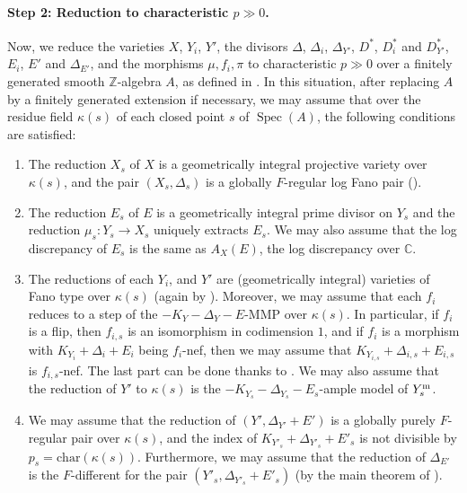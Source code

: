 \documentclass[11pt,reqno]{amsart}
\newcommand{\C}{\mathbb{C}}
\newcommand{\Z}{\mathbb{Z}}
\DeclareMathOperator{\Spec}{Spec}
\numberwithin{equation}{section}
\theoremstyle{definition}
\begin{document}
\medskip

\paragraph{\textbf{Step 2: Reduction to characteristic $p \gg 0$.}} Now, we reduce the varieties $X$, $Y_i$, $Y'$, the divisors $\Delta$, $\Delta_i$, $\Delta_{Y'}$, $D^*$, $D^* _ i$ and $D^* _{Y'}$, $E_i$, $E'$ and $\Delta_{E'}$, and the morphisms $ \mu, f_i, \pi $ to characteristic $p \gg 0$ over a finitely generated smooth $\Z$-algebra $A$, as defined in . In this situation, after replacing $A$ by a finitely generated extension if necessary, we may assume that over the residue field $\kappa (s)$ of each closed point $s$ of $\Spec(A)$, the following conditions are satisfied:
\begin{enumerate}
    \item The reduction $X_s$ of $X$ is a geometrically integral projective variety over $\kappa(s)$, and the pair $(X_s, \Delta_s)$ is a globally $F$-regular log Fano pair (\cite[Theorem~5.1]{SchwedeSmithLogFanoVsGloballyFRegular}).
    \item The reduction $E_s$ of $E$ is a geometrically integral prime divisor on $Y_s$ and the reduction $\mu_s: Y_s \to X_s$ uniquely extracts $E_s$. We may also assume that the log discrepancy of $E_s$ is the same as $A_X(E)$, the log discrepancy over $\C$.
    \item The reductions of each $Y_i$, and $Y'$ are (geometrically integral) varieties of Fano type over $\kappa(s)$ (again by \cite[Theorem 5.1]{SchwedeSmithLogFanoVsGloballyFRegular}). Moreover, we may assume that each $f_i$ reduces to a step of the $-K_Y -\Delta_Y -E$-MMP over $\kappa(s)$. In particular, if $f_i$ is a flip, then $f_{i,s}$ is an isomorphism in codimension $1$, and if $f_i$ is a morphism with $K_{Y_i} + \Delta_i + E_i$ being $f_i$-nef, then we may assume that $K_{Y_{i,s}}+\Delta_{i,s}+E_{i,s}$ is $f_{i,s}$-nef. The last part can be done thanks to . We may also assume that the reduction of $Y'$ to $\kappa (s) $ is the $-K_{Y_s} - \Delta_{Y_s} - E_s$-ample model of $Y^{\rm m} _s$.
    \item We may assume that the reduction of $(Y', \Delta_{Y'}+ E')$ is a globally purely $F$-regular pair over $\kappa(s)$, and the index of $K_{Y'_s} + \Delta_{Y'_s} + E'_s$ is not divisible by $p_s = \text{char}(\kappa(s))$. Furthermore, we may assume that the reduction of $\Delta_{E'}$ is the $F$-different for the pair $(Y' _s, \Delta_{Y' _s} + E'_s)$ (by the main theorem of \cite{das_different_different_different}).
    

\end{enumerate}
\end{document}
